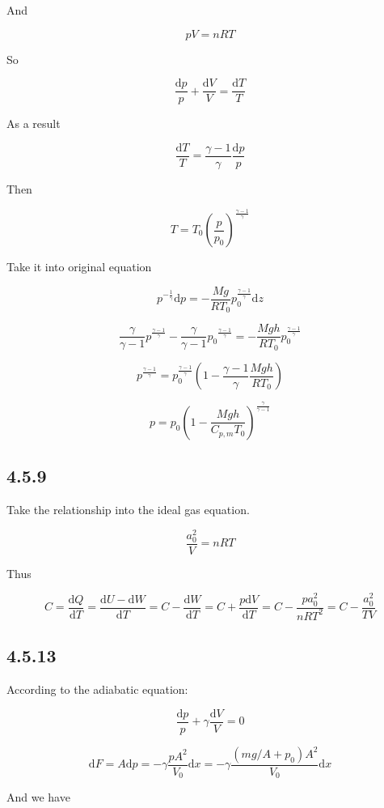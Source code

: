 \documentclass[a4paper,11pt]{amsart}
\theoremstyle{definition}
\begin{document}
	And
	
	$$
	pV=nRT
	$$
	
	So
	
	$$
	\frac{\mathrm{d}p}{p}+\frac{\mathrm{d}V}{V}=\dfrac{\mathrm{d}T}{T}
	$$
	
	As a result
	
	$$
	\frac{\mathrm{d}T}{T}=\frac{\gamma -1}{\gamma}\frac{\mathrm{d}p}{p}
	$$
	
	Then
	
	$$
	T=T_0\left( \frac{p}{p_0} \right) ^{\frac{\gamma -1}{\gamma}}
	$$
	
	Take it into original equation
	
	$$
	p^{-\frac{1}{\gamma}}\mathrm{d}p=-\frac{Mg}{RT_0}p_{0}^{\frac{\gamma -1}{\gamma}}\mathrm{d}z
	$$
	
	$$
	\frac{\gamma}{\gamma -1}p^{\frac{\gamma -1}{\gamma}}-\frac{\gamma}{\gamma -1}{p_0}^{\frac{\gamma -1}{\gamma}}=-\frac{Mgh}{RT_0}p_{0}^{\frac{\gamma -1}{\gamma}}
	$$
	
	$$
	p^{\frac{\gamma -1}{\gamma}}=p_{0}^{\frac{\gamma -1}{\gamma}}\left( 1-\frac{\gamma -1}{\gamma}\frac{Mgh}{RT_0} \right) 
	$$
	
	$$
	p=p_0\left( 1-\frac{Mgh}{C_{p,m}T_0} \right) ^{\frac{\gamma}{\gamma -1}}
	$$
	
	\subsection*{4.5.9}
	
	Take the relationship into the ideal gas equation.
	
	$$
	\frac{a_{0}^{2}}{V}=nRT
	$$
	
	Thus
	
	$$
	C=\frac{\mathrm{d}Q}{\mathrm{d}T}=\frac{\mathrm{d}U-\mathrm{d}W}{\mathrm{d}T}=C-\frac{\mathrm{d}W}{\mathrm{d}T}=C+\frac{p\mathrm{d}V}{\mathrm{d}T}=C-\frac{pa_{0}^{2}}{nRT^2}=C-\frac{a_{0}^{2}}{TV}
	$$
	
	\subsection*{4.5.13}
	
	According to the adiabatic equation:
	
	$$
	\frac{\mathrm{d}p}{p}+\gamma \frac{\mathrm{d}V}{V}=0
	$$
	
	$$
	\mathrm{d}F=A\mathrm{d}p=-\gamma \frac{pA^2}{V_0}\mathrm{d}x=-\gamma \frac{\left( mg/A+p_0 \right) A^2}{V_0}\mathrm{d}x
	$$
	
	And we have
	
\end{document}
